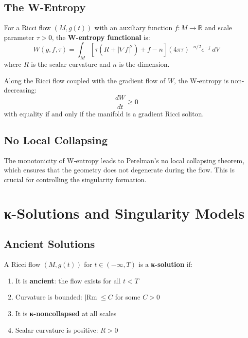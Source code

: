 \section{The W-Entropy}

\begin{definition}[W-Entropy]
\label{def:w_entropy}
\leanok
{}
For a Ricci flow $(M, g(t))$ with an auxiliary function $f : M \to \mathbb{R}$ and scale parameter $\tau > 0$, the \textbf{W-entropy functional} is:
\[
W(g, f, \tau) = \int_M \left[\tau(R + |\nabla f|^2) + f - n\right] (4\pi\tau)^{-n/2} e^{-f} \, dV
\]
where $R$ is the scalar curvature and $n$ is the dimension.
\end{definition}

\begin{theorem}
\label{thm:w_entropy_monotone}
\leanok
{}
Along the Ricci flow coupled with the gradient flow of $W$, the W-entropy is non-decreasing:
\[
\frac{dW}{dt} \geq 0
\]
with equality if and only if the manifold is a gradient Ricci soliton.
\end{theorem}

\section{No Local Collapsing}

The monotonicity of W-entropy leads to Perelman's no local collapsing theorem, which ensures that the geometry does not degenerate during the flow. This is crucial for controlling the singularity formation.

\chapter{κ-Solutions and Singularity Models}
\label{chap:kappa_solutions}

\section{Ancient Solutions}

\begin{definition}[κ-Solution]
\label{def:kappa_solution}
\leanok
{}
A Ricci flow $(M, g(t))$ for $t \in (-\infty, T)$ is a \textbf{κ-solution} if:
\begin{enumerate}
\item It is \textbf{ancient}: the flow exists for all $t < T$
\item Curvature is bounded: $|\text{Rm}| \leq C$ for some $C > 0$
\item It is \textbf{κ-noncollapsed} at all scales
\item Scalar curvature is positive: $R > 0$
\end{enumerate}
\end{definition}

